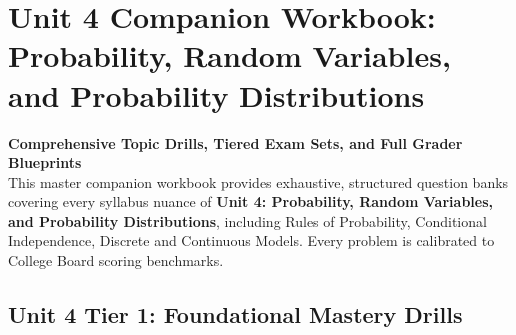 \chapter{Unit 4 Companion Workbook: Probability, Random Variables, and Probability Distributions}
\label{chap:companion_unit_4}
{\large\bfseries\color{MidnightBlue} Comprehensive Topic Drills, Tiered Exam Sets, and Full Grader Blueprints}\\[8pt]
This master companion workbook provides exhaustive, structured question banks covering every syllabus nuance of \textbf{Unit 4: Probability, Random Variables, and Probability Distributions}, including Rules of Probability, Conditional Independence, Discrete and Continuous Models. Every problem is calibrated to College Board scoring benchmarks.\\[12pt]
\section{Unit 4 Tier 1: Foundational Mastery Drills}
